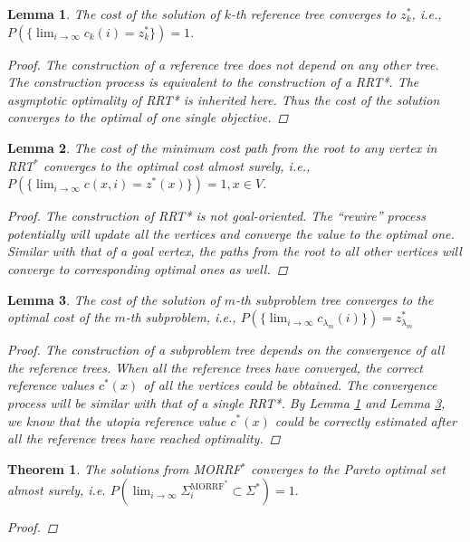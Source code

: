 \documentclass[conference]{IEEEtran}
\newtheorem{thm}{Theorem}
\newtheorem{lem}{Lemma}
\theoremstyle{definition}
\begin{document}
\begin{lem}
\label{lem:ref_tree:conv}
The cost of the solution of $ k $-th reference tree converges to $ z^{*}_{k} $, i.e., 
$ P( \{ \lim_{ i \rightarrow \infty }  c_{k} ( i ) = z^{*}_{k}  \} ) = 1  $.
\begin{proof}
The construction of a reference tree does not depend on any other tree.
The construction process is equivalent to the construction of a RRT*.
The asymptotic optimality of RRT* is inherited here.
Thus the cost of the solution converges to the optimal of one single objective.
\end{proof}
\end{lem}

\begin{lem}
\label{lem:tree_vex:conv}
The cost of the minimum cost path from the root to any vertex in RRT$^{*}$ converges to the optimal cost almost surely, i.e.,
$
P( \{ \lim_{ i \rightarrow \infty } c(x, i)  = z^{*}(x) \} ) = 1, x \in V $.
\begin{proof}
The construction of RRT* is not goal-oriented.
The ``rewire'' process potentially will update all the vertices and converge the value to the optimal one.
Similar with that of a goal vertex, the paths from the root to all other vertices will converge to corresponding optimal ones as well.
\end{proof}
\end{lem}

\begin{lem}
\label{lem:sub_tree:conv}
The cost of the solution of $ m $-th subproblem tree converges to the optimal cost of the $ m $-th subproblem, i.e.,
$
P( \{ \lim_{ i \rightarrow \infty } c_{ \lambda_{m} }( i ) \} ) = z^{*}_{ \lambda_{m} }
$
\begin{proof}
The construction of a subproblem tree depends on the convergence of all the reference trees.
When all the reference trees have converged, the correct reference values $ c^{*} (x) $ of all the vertices could be obtained.
The convergence process will be similar with that of a single RRT*.
By Lemma \ref{lem:ref_tree:conv} and Lemma \ref{lem:sub_tree:conv}, we know that the utopia reference value $ c^{*} (x) $ could be correctly estimated after all the reference trees have reached optimality.
\end{proof}
\end{lem}

\begin{thm}
\label{thm:morrt:conv}
The solutions from MORRF$^{*} $ converges to the Pareto optimal set almost surely, i.e.
$
P( \lim_{ i \rightarrow \infty }  \Sigma^{\mbox{MORRF}^{*}}_{i}  \subset \Sigma^{*} ) = 1.
$
\begin{proof}
\end{proof}
\end{thm}
\end{document}
